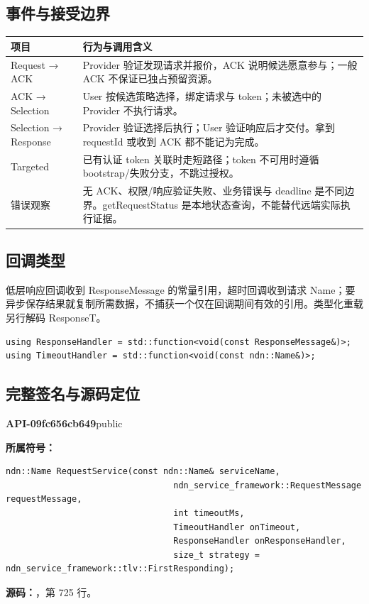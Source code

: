 \subsection{事件与接受边界}

\begin{longtable}{@{}p{43mm}p{119mm}@{}}
\toprule
项目 & 行为与调用含义 \\
\midrule\endhead
Request → ACK & Provider 验证发现请求并报价，ACK 说明候选愿意参与；一般 ACK 不保证已独占预留资源。 \\
ACK → Selection & User 按候选策略选择，绑定请求与 token；未被选中的 Provider 不执行请求。 \\
Selection → Response & Provider 验证选择后执行；User 验证响应后才交付。拿到 requestId 或收到 ACK 都不能记为完成。 \\
Targeted & 已有认证 token 关联时走短路径；token 不可用时遵循 bootstrap/失败分支，不跳过授权。 \\
错误观察 & 无 ACK、权限/响应验证失败、业务错误与 deadline 是不同边界。getRequestStatus 是本地状态查询，不能替代远端实际执行证据。 \\
\bottomrule
\end{longtable}

\subsection{回调类型}
低层响应回调收到 ResponseMessage 的常量引用，超时回调收到请求 Name；要异步保存结果就复制所需数据，不捕获一个仅在回调期间有效的引用。类型化重载另行解码 ResponseT。
\begin{Verbatim}[fontsize=\footnotesize,breaklines,breakanywhere]
using ResponseHandler = std::function<void(const ResponseMessage&)>;
using TimeoutHandler = std::function<void(const ndn::Name&)>;
\end{Verbatim}

\subsection{完整签名与源码定位}

\textbf{API-09fc656cb649}\quad public\par
\textbf{所属符号：}\par
\begin{Verbatim}[fontsize=\footnotesize,breaklines,breakanywhere]
ndn::Name RequestService(const ndn::Name& serviceName,
                                 ndn_service_framework::RequestMessage requestMessage,
                                 int timeoutMs,
                                 TimeoutHandler onTimeout,
                                 ResponseHandler onResponseHandler,
                                 size_t strategy = ndn_service_framework::tlv::FirstResponding);
\end{Verbatim}
\textbf{源码：}，第 725 行。\par

